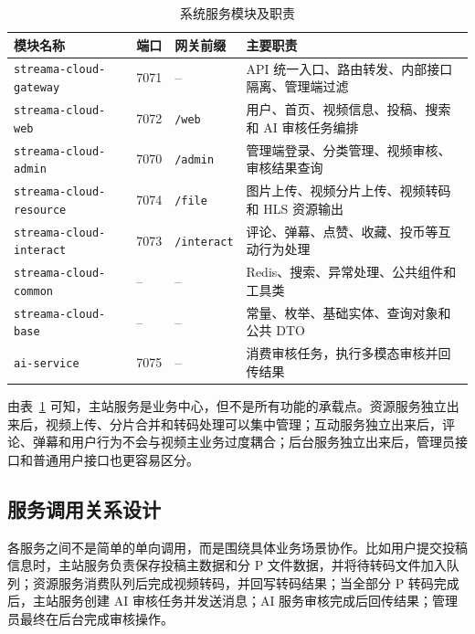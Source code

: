 \begin{table}[htbp]
  \centering
  \caption{系统服务模块及职责}
  \label{tab:service-modules}
  \begin{tabular}{p{}p{}p{}p{}}
    \hline
    \textbf{模块名称} & \textbf{端口} & \textbf{网关前缀} & \textbf{主要职责} \\
    \hline
    \texttt{streama-cloud-gateway} & 7071 & -- & API 统一入口、路由转发、内部接口隔离、管理端过滤 \\
    \texttt{streama-cloud-web} & 7072 & \texttt{/web} & 用户、首页、视频信息、投稿、搜索和 AI 审核任务编排 \\
    \texttt{streama-cloud-admin} & 7070 & \texttt{/admin} & 管理端登录、分类管理、视频审核、审核结果查询 \\
    \texttt{streama-cloud-resource} & 7074 & \texttt{/file} & 图片上传、视频分片上传、视频转码和 HLS 资源输出 \\
    \texttt{streama-cloud-interact} & 7073 & \texttt{/interact} & 评论、弹幕、点赞、收藏、投币等互动行为处理 \\
    \texttt{streama-cloud-common} & -- & -- & Redis、搜索、异常处理、公共组件和工具类 \\
    \texttt{streama-cloud-base} & -- & -- & 常量、枚举、基础实体、查询对象和公共 DTO \\
    \texttt{ai-service} & 7075 & -- & 消费审核任务，执行多模态审核并回传结果 \\
    \hline
  \end{tabular}
\end{table}

由表~\ref{tab:service-modules} 可知，主站服务是业务中心，但不是所有功能的承载点。资源服务独立出来后，视频上传、分片合并和转码处理可以集中管理；互动服务独立出来后，评论、弹幕和用户行为不会与视频主业务过度耦合；后台服务独立出来后，管理员接口和普通用户接口也更容易区分。

\subsection{服务调用关系设计}
\label{subsec:service-call-relation}

各服务之间不是简单的单向调用，而是围绕具体业务场景协作。比如用户提交投稿信息时，主站服务负责保存投稿主数据和分 P 文件数据，并将待转码文件加入队列；资源服务消费队列后完成视频转码，并回写转码结果；当全部分 P 转码完成后，主站服务创建 AI 审核任务并发送消息；AI 服务审核完成后回传结果；管理员最终在后台完成审核操作。

